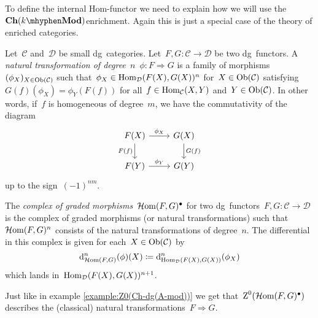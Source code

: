 To define the internal Hom-functor we need to explain how we will use the~$\Ch(k\mhyphen\Mod)$\dash enrichment. Again this is just a special case of the theory of enriched categories.
\begin{definition}
  \label{definition:complex-of-graded-morphisms}
  Let~$\mathcal{C}$ and~$\mathcal{D}$ be small dg~categories. Let~$F,G\colon\mathcal{C}\to\mathcal{D}$ be two dg~functors. A \emph{natural transformation of degree~$n$}~$\phi\colon F\Rightarrow G$ is a family of morphisms~$(\phi_X)_{X\in\mathrm{Ob}(\mathcal{C})}$ such that~$\phi_X\in\mathrm{Hom}_{\mathcal{D}}(F(X),G(X))^n$ for~$X\in\mathrm{Ob}(\mathcal{C})$ satisfying~$G(f)(\phi_X)=\phi_Y(F(f))$ for all~$f\in\mathrm{Hom}_{\mathcal{C}}(X,Y)$ and~$Y\in\mathrm{Ob}(\mathcal{C})$. In other words, if~$f$ is homogeneous of degree~$m$, we have the commutativity of the diagram
  \begin{equation}
    \begin{tikzcd}
      F(X) \arrow{r}{\phi_X} \arrow[swap]{d}{F(f)} & G(X) \arrow{d}{G(f)} \\
      F(Y) \arrow{r}{\phi_Y} & G(Y)
    \end{tikzcd}
  \end{equation}
  up to the sign~$(-1)^{nm}$.

  The \emph{complex of graded morphisms}~$\operatorname{\mathcal{H}om}(F,G)^\bullet$ for two dg~functors~$F,G\colon\mathcal{C}\to\mathcal{D}$ is the complex of graded morphisms (or natural transformations) such that~$\operatorname{\mathcal{H}om}(F,G)^n$ consists of the natural transformations of degree~$n$. The differential in this complex is given for each~$X\in\mathrm{Ob}(\mathcal{C})$ by
  \begin{equation}
    \mathrm{d}_{\operatorname{\mathcal{H}om}(F,G)}^n(\phi)(X)\coloneqq\mathrm{d}_{\mathrm{Hom}_{\mathcal{D}}(F(X),G(X))}^n(\phi_X)
  \end{equation}
  which lands in~$\mathrm{Hom}_{\mathcal{D}}(F(X),G(X))^{n+1}$.
\end{definition}

\begin{example}
  Just like in example \ref{example:Z0(Ch-dg(A-mod))} we get that~$\operatorname{Z}^0(\operatorname{\mathcal{H}om}(F,G)^\bullet)$ describes the (classical) natural transformations~$F\Rightarrow G$.
\end{example}

